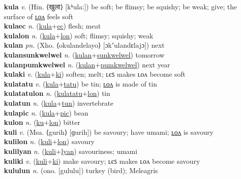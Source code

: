 \textbf{kula} \textit{v.} (Hin. ⟨खुला⟩ [kʰulaː])
be soft; be flimsy; be squishy; be weak; give; the surface of \hyperref[kulalon]{ʟᴏᴧ} feels soft \label{kula} \\
\textbf{kulaec} \textit{n.} (\hyperref[kula]{kula}+\hyperref[ec]{ec})
flesh; meat \label{kulaec} \\
\textbf{kulalon} \textit{n.} (\hyperref[kula]{kula}+\hyperref[lon]{lon})
soft; flimsy; squishy; weak \label{kulalon} \\
\textbf{kulan} \textit{pn.} (Xho. ⟨okulandelayo⟩ [ɔkʼulandɛlajɔ])
next \label{kulan} \\
\textbf{kulansunkwelwel} \textit{n.} (\hyperref[kulan]{kulan}+\hyperref[sunkwelwel]{sunkwelwel})
tomorrow \label{kulansunkwelwel} \\
\textbf{kulanpumkwelwel} \textit{n.} (\hyperref[kulan]{kulan}+\hyperref[pumkwelwel]{pumkwelwel})
next year \label{kulanpumkwelwel} \\
\textbf{kulaki} \textit{v.} (\hyperref[kula]{kula}+\hyperref[ki]{ki})
soften; melt; ʟєꜱ makes ʟᴏᴧ become soft \label{kulaki} \\
\textbf{kulatatu} \textit{v.} (\hyperref[kula]{kula}+\hyperref[tatu]{tatu})
be tin; \hyperref[kulatatulon]{ʟᴏᴧ} is made of tin \label{kulatatu} \\
\textbf{kulatatulon} \textit{n.} (\hyperref[kulatatu]{kulatatu}+\hyperref[lon]{lon})
tin \label{kulatatulon} \\
\textbf{kulatun} \textit{n.} (\hyperref[kula]{kula}+\hyperref[tun]{tun})
invertebrate \label{kulatun} \\
\textbf{kulapic} \textit{n.} (\hyperref[kula]{kula}+\hyperref[pic]{pic})
bean \label{kulapic} \\
\textbf{kulon} \textit{n.} (\hyperref[ku]{ku}+\hyperref[lon]{lon})
bitter \label{kulon} \\
\textbf{kuli} \textit{v.} (Msa. ⟨gurih⟩ [ɡurih])
be savoury; have umami; \hyperref[kulilon]{ʟᴏᴧ} is savoury \label{kuli} \\
\textbf{kulilon} \textit{n.} (\hyperref[kuli]{kuli}+\hyperref[lon]{lon})
savoury \label{kulilon} \\
\textbf{kulilyan} \textit{n.} (\hyperref[kuli]{kuli}+\hyperref[lyan]{lyan})
savouriness; umami \label{kulilyan} \\
\textbf{kuliki} \textit{v.} (\hyperref[kuli]{kuli}+\hyperref[ki]{ki})
make savoury; ʟєꜱ makes ʟᴏᴧ become savoury \label{kuliki} \\
\textbf{kululun} \textit{n.} (ono. [gululu])
turkey (bird); Meleagris \label{kululun} \\
